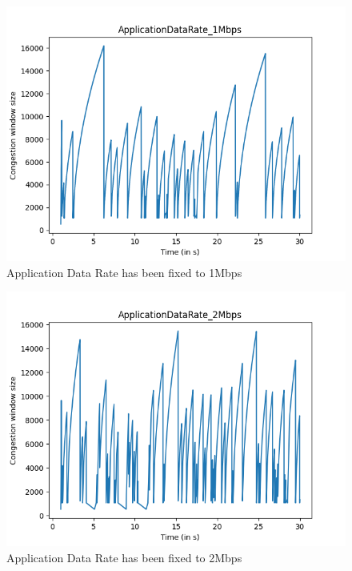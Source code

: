 \documentclass{article}
\begin{document}
\begin{figure}[H]
    \centering
    \includegraphics[scale = 0.8]{Q2/outputs/plots/ApplicationDataRate_1Mbps.png}
    \caption{Application Data Rate has been fixed to 1Mbps}
\end{figure}

\begin{figure}[H]
    \centering
    \includegraphics[scale = 0.8]{Q2/outputs/plots/ApplicationDataRate_2Mbps.png}
    \caption{Application Data Rate has been fixed to 2Mbps}
\end{figure}
\end{document}
